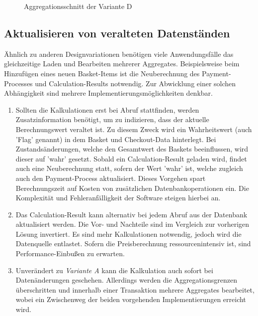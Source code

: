 \begin{figure}[htbp]
	\centering
	
	\caption{Aggregationsschnitt der Variante D}
	\label{fig:VarD}
\end{figure}

\subsection{Aktualisieren von veralteten Datenständen}

Ähnlich zu anderen Designvariationen benötigen viele Anwendungsfälle das gleichzeitige Laden und Bearbeiten mehrerer Aggregates. Beispielsweise beim Hinzufügen eines neuen Basket-Items ist die Neuberechnung des Payment-Processes und Calculation-Results notwendig. Zur Abwicklung einer solchen Abhängigkeit sind mehrere Implementierungsmöglichkeiten denkbar. 

\begin{enumerate}[topsep=-2pt]
	\item { Sollten die Kalkulationen erst bei Abruf stattfinden, werden Zusatzinformation benötigt, um zu indizieren, dass der aktuelle Berechnungswert veraltet ist. Zu diesem Zweck wird ein Wahrheitswert (auch 'Flag' genannt) in dem Basket und Checkout-Data hinterlegt. Bei Zustandsänderungen, welche den Gesamtwert des Baskets beeinflussen, wird dieser auf 'wahr' gesetzt. Sobald ein Calculation-Result geladen wird, findet auch eine Neuberechnung statt, sofern der Wert 'wahr' ist, welche zugleich auch den Payment-Process aktualisiert. Dieses Vorgehen spart Berechnungszeit auf Kosten von zusätzlichen Datenbankoperationen ein. Die Komplexität und Fehleranfälligkeit der Software steigen hierbei an.  }
	\item { Das Calculation-Result kann alternativ bei jedem Abruf aus der Datenbank aktualisiert werden. Die Vor- und Nachteile sind im Vergleich zur vorherigen Lösung invertiert. Es sind mehr Kalkulationen notwendig, jedoch wird die Datenquelle entlastet. Sofern die Preisberechnung ressourcenintensiv ist, sind Performance-Einbußen zu erwarten.  }
	\item { Unverändert zu \emph{Variante A} kann die Kalkulation auch sofort bei Datenänderungen geschehen. Allerdings werden die Aggregationsgrenzen überschritten und innerhalb einer Transaktion mehrere Aggregates bearbeitet, wobei ein Zwischenweg der beiden vorgehenden Implementierungen erreicht wird.  }
\end{enumerate}

